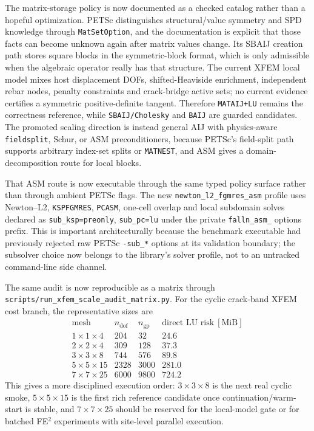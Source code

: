 The matrix-storage policy is now documented as a checked catalog rather than a
hopeful optimization.  PETSc distinguishes structural/value symmetry and SPD
knowledge through \texttt{MatSetOption}, and the documentation is explicit that
those facts can become unknown again after matrix values change.  Its SBAIJ
creation path stores square blocks in the symmetric-block format, which is only
admissible when the algebraic operator really has that structure.  The current
XFEM local model mixes host displacement DOFs, shifted-Heaviside enrichment,
independent rebar nodes, penalty constraints and crack-bridge active sets; no
current evidence certifies a symmetric positive-definite tangent.  Therefore
\texttt{MATAIJ+LU} remains the correctness reference, while
\texttt{SBAIJ/Cholesky} and \texttt{BAIJ} are guarded candidates.  The promoted
scaling direction is instead general AIJ with physics-aware
\texttt{fieldsplit}, Schur, or ASM preconditioners, because PETSc's
field-split path supports arbitrary index-set splits or \texttt{MATNEST}, and
ASM gives a domain-decomposition route for local blocks.

That ASM route is now executable through the same typed policy surface rather
than through ambient PETSc flags.  The new
\texttt{newton\_l2\_fgmres\_asm} profile uses Newton--L2, \texttt{KSPFGMRES},
\texttt{PCASM}, one-cell overlap and local subdomain solves declared as
\texttt{sub\_ksp=preonly}, \texttt{sub\_pc=lu} under the private
\texttt{falln\_asm\_} options prefix.  This is important architecturally
because the benchmark executable had previously rejected raw PETSc
\texttt{-sub\_*} options at its validation boundary; the subsolver choice now
belongs to the library's solver profile, not to an untracked command-line side
channel.

The same audit is now reproducible as a matrix through
\texttt{scripts/run\_xfem\_scale\_audit\_matrix.py}.  For the cyclic
crack-band XFEM cost branch, the representative sizes are
\[
\begin{array}{c|r|r|r}
\text{mesh} & n_{\mathrm{dof}} & n_{\mathrm{gp}} &
  \text{direct LU risk}~[\mathrm{MiB}]\\
\hline
1\times1\times4  & 204  & 32   & 24.6\\
2\times2\times4  & 309  & 128  & 37.3\\
3\times3\times8  & 744  & 576  & 89.8\\
5\times5\times15 & 2328 & 3000 & 281.0\\
7\times7\times25 & 6000 & 9800 & 724.2
\end{array}
\]
This gives a more disciplined execution order: \(3\times3\times8\) is the next
real cyclic smoke, \(5\times5\times15\) is the first rich reference candidate
once continuation/warm-start is stable, and \(7\times7\times25\) should be
reserved for the local-model gate or for batched FE\(^2\) experiments with
site-level parallel execution.

